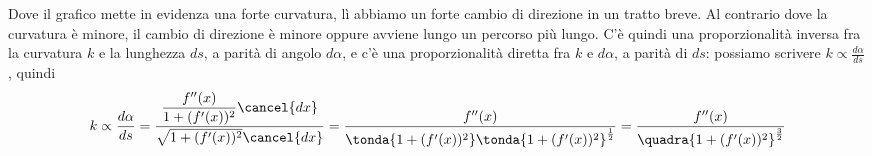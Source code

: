 
Dove il grafico mette in evidenza una forte curvatura, lì abbiamo un 
forte cambio di direzione in un tratto breve. Al contrario dove la curvatura è 
minore, il cambio di direzione è minore oppure avviene lungo un percorso più 
lungo. C'è quindi una proporzionalità inversa fra la curvatura \(k\) e la 
lunghezza \(ds\), a parità di angolo \(d\alpha\), e c'è una proporzionalità 
diretta fra \(k \) e \(d\alpha\), a parità di \(ds\): possiamo scrivere
\(k\propto\frac{d\alpha}{ds}\), quindi 
\[
 k\propto\frac{d\alpha}{ds} = 
 \dfrac{\dfrac{f''(x)}{1+(f'(x))^2} \cancel{dx}} 
       {\sqrt{1+(f'(x))^2} \cancel{dx}} = 
 \dfrac{f''(x)} 
       {\tonda{1+(f'(x))^2}\tonda{1+(f'(x))^2}^{\frac{1}{2}}} = 
 \dfrac{f''(x)}{\quadra{1+(f'(x))^2}^{\frac{3}{2}}}
\]

